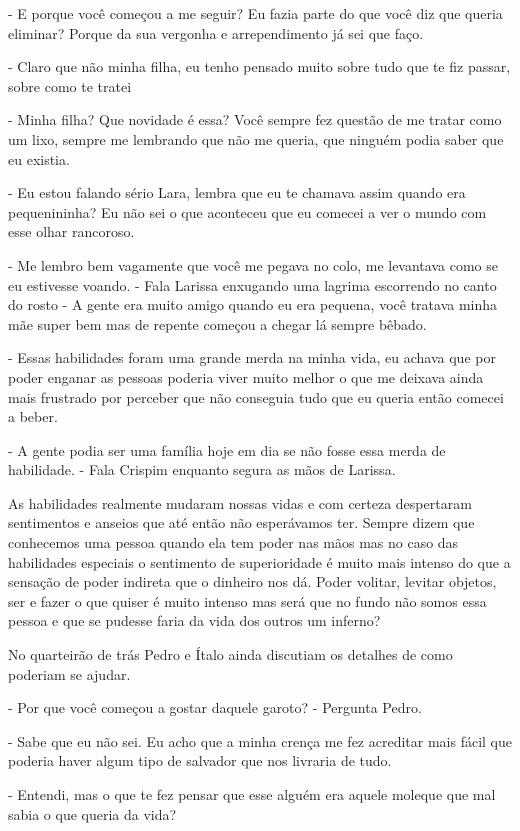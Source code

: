 - E porque você começou a me seguir? Eu fazia parte do que você diz que queria eliminar? Porque da sua vergonha e arrependimento já sei que faço.

- Claro que não minha filha, eu tenho pensado muito sobre tudo que te fiz passar, sobre como te tratei

- Minha filha? Que novidade é essa? Você sempre fez questão de me tratar como um lixo, sempre me lembrando que não me queria, que ninguém podia saber que eu existia.

- Eu estou falando sério Lara, lembra que eu te chamava assim quando era pequenininha? Eu não sei o que aconteceu que eu comecei a ver o mundo com esse olhar rancoroso.

- Me lembro bem vagamente que você me pegava no colo, me levantava como se eu estivesse voando. - Fala Larissa enxugando uma lagrima escorrendo no canto do rosto - A gente era muito amigo quando eu era pequena, você tratava minha mãe super bem mas de repente começou a chegar lá sempre bêbado.

- Essas habilidades foram uma grande merda na minha vida, eu achava que por poder enganar as pessoas poderia viver muito melhor o que me deixava ainda mais frustrado por perceber que não conseguia tudo que eu queria então comecei a beber.

- A gente podia ser uma família hoje em dia se não fosse essa merda de habilidade. - Fala Crispim enquanto segura as mãos de Larissa.

As habilidades realmente mudaram nossas vidas e com certeza despertaram sentimentos e anseios que até então não esperávamos ter. Sempre dizem que conhecemos uma pessoa quando ela tem poder nas mãos mas no caso das habilidades especiais o sentimento de superioridade é muito mais intenso do que a sensação de poder indireta que o dinheiro nos dá. Poder volitar, levitar objetos, ser e fazer o que quiser é muito intenso mas será que no fundo não somos essa pessoa e que se pudesse faria da vida dos outros um inferno?

No quarteirão de trás Pedro e Ítalo ainda discutiam os detalhes de como poderiam se ajudar.

- Por que você começou a gostar daquele garoto? - Pergunta Pedro.

- Sabe que eu não sei. Eu acho que a minha crença me fez acreditar mais fácil que poderia haver algum tipo de salvador que nos livraria de tudo.

- Entendi, mas o que te fez pensar que esse alguém era aquele moleque que mal sabia o que queria da vida?

